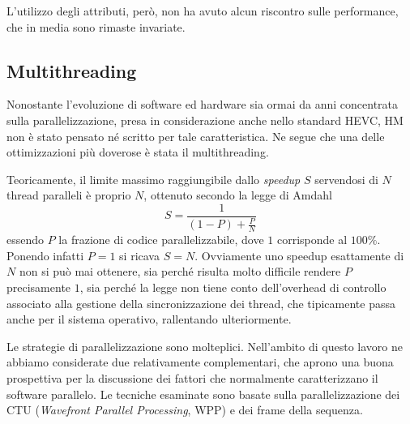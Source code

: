 L'utilizzo degli attributi, però, non ha avuto alcun riscontro sulle 
performance, che in media sono rimaste invariate. \\
\label{sect-multi}\subsection{Multithreading}
Nonostante l'evoluzione di software ed hardware sia ormai da anni concentrata 
sulla parallelizzazione, presa in considerazione anche nello standard HEVC, HM 
non è stato 
pensato né scritto per tale 
caratteristica. Ne segue che una delle ottimizzazioni più doverose è stata il 
multithreading.
\par Teoricamente, il limite massimo raggiungibile dallo \emph{speedup} $S$ 
servendosi 
di $N$ thread paralleli è proprio $N$, ottenuto secondo la legge di Amdahl
$$S = \frac{1}{(1-P)+\frac{P}{N}}$$
essendo $P$ la frazione di codice parallelizzabile, dove $1$ corrisponde al 
$100\%$. Ponendo infatti $P = 1$ si ricava $S = N$. Ovviamente uno speedup 
esattamente di $N$ non si può mai ottenere, sia perché risulta molto difficile 
rendere 
$P$ precisamente $1$, sia perché la legge non tiene conto dell'overhead di 
controllo associato alla gestione della sincronizzazione dei thread, che 
tipicamente passa anche per il sistema operativo, rallentando ulteriormente.
\par Le strategie di parallelizzazione sono molteplici. Nell'ambito di questo 
lavoro ne abbiamo considerate due relativamente complementari, che aprono
una buona prospettiva per la discussione dei fattori che normalmente 
caratterizzano il software parallelo. Le tecniche esaminate sono basate sulla 
parallelizzazione dei CTU (\emph{Wavefront Parallel Processing}, WPP) e dei 
frame della sequenza.

